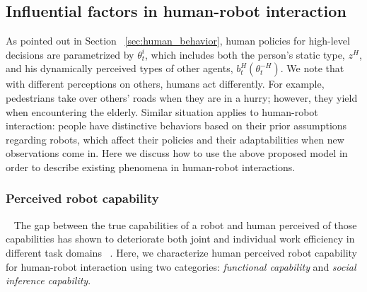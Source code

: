 \documentclass[letterpaper, 10 pt, conference]{ieeeconf}  %
\begin{document}


\subsection{Influential factors in human-robot interaction}
As pointed out in Section ~\ref{sec:human_behavior}, human policies for high-level decisions are parametrized by $\theta^i_t$, which includes both the person's static type, $z^H$, and his dynamically perceived types of other agents, $b^H_t(\theta^{-H}_t)$. We note that with different perceptions on others, humans act differently. For example, pedestrians take over others' roads when they are in a hurry; however, they yield when encountering the elderly. Similar situation 
applies to human-robot interaction: people have distinctive behaviors based on their prior assumptions regarding robots, which affect their policies and their adaptabilities when new observations come in. Here we discuss how to use the above proposed model in order to describe	 existing phenomena in human-robot interactions. 

\subsubsection{Perceived robot capability}~\label{sec:perceived}
The gap between the true capabilities of a robot and human perceived of those capabilities has shown to deteriorate both joint and individual work efficiency in different task domains ~\cite{dragan2015effects}. Here, we characterize human perceived robot capability for human-robot interaction using two categories: \textit{functional capability} and \textit{social inference capability}.
\end{document}
